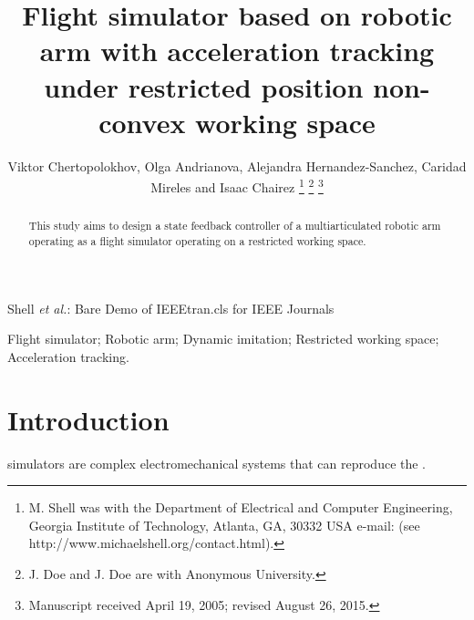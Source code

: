 \documentclass[journal,twocolumn]{IEEEtran}
\begin{document}
%
\title{Flight simulator based on robotic arm with acceleration tracking under restricted position  non-convex working space}

\author{Viktor Chertopolokhov, Olga Andrianova, Alejandra Hernandez-Sanchez, Caridad Mireles
        and Isaac Chairez%
\thanks{M. Shell was with the Department
of Electrical and Computer Engineering, Georgia Institute of Technology, Atlanta,
GA, 30332 USA e-mail: (see http://www.michaelshell.org/contact.html).}%
\thanks{J. Doe and J. Doe are with Anonymous University.}%
\thanks{Manuscript received April 19, 2005; revised August 26, 2015.}}



%
{Shell \MakeLowercase{\textit{et al.}}: Bare Demo of IEEEtran.cls for IEEE Journals}



\maketitle

\begin{abstract}
This study aims to design a state feedback controller of a multiarticulated robotic arm operating as a flight simulator operating on a restricted working space. 
\end{abstract}

\begin{IEEEkeywords}
Flight simulator; Robotic arm; Dynamic imitation; Restricted working space; Acceleration tracking.
\end{IEEEkeywords}



\IEEEpeerreviewmaketitle



\section{Introduction}

 simulators are complex electromechanical systems that can reproduce the .
\end{document}
